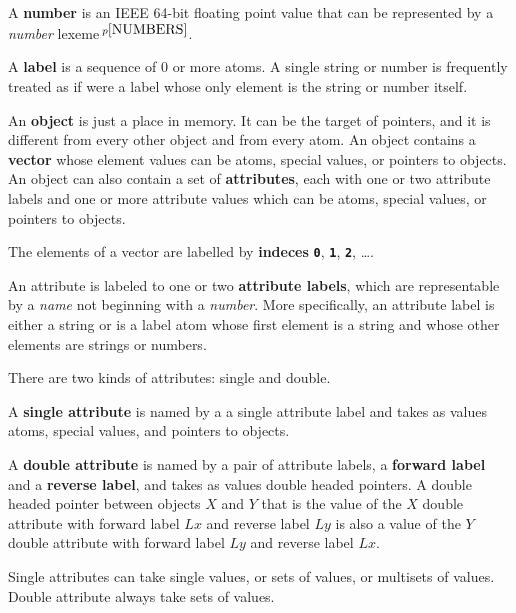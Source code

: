 \documentclass[12pt]{article}
\newcommand{\TT}[1]{{\tt \bfseries #1}}
\newcommand{\key}[1]{{\rm \bfseries #1}}
\newcommand{\pagnote}[1]{$\,^{p\pageref{#1}}$}
\begin{document}
A \key{number} is an IEEE 64-bit floating point
value that can be represented by a {\em number} lexeme\pagnote{NUMBERS}.

A \key{label}\label{LABEL} is a sequence of 0 or more atoms.
A single string or number is frequently
treated as if were a label whose only element
is the string or number itself.

An \key{object}\label{OBJECT} is just a place in memory.
It can be the target of pointers, and it is different from
every other object and from every atom.  An object contains a \key{vector}
whose element values can be atoms, special values, or pointers to objects.
An object can also contain a set of \key{attributes}, each with one or two
attribute labels and one or more attribute values which can be atoms,
special values, or pointers to objects.

The elements of a vector are labelled by \key{indeces}
\TT{0}, \TT{1}, \TT{2}, \ldots{}.

An attribute is labeled to one or two \key{attribute labels}, which are
representable by a {\em name} not beginning with a {\em number}.
More specifically, an attribute label is either a string or is a
label atom whose first element is a string and whose other elements
are strings or numbers.

There are two kinds of attributes: single and double.

A \key{single attribute} is named by a a single attribute label and
takes as values atoms, special values, and pointers to objects.

A \key{double attribute} is named by a pair of attribute labels,
a \key{forward label} and a \key{reverse label}, and
takes as values double headed pointers.
A double headed pointer between objects $X$ and $Y$
that is the value of the $X$ double attribute with
forward label $Lx$ and reverse label $Ly$ is also a value of the
$Y$ double attribute with forward label $Ly$ and reverse label $Lx$.

Single attributes can take single values, or sets of values, or
multisets of values.  Double attribute always take sets of values.
\end{document}

